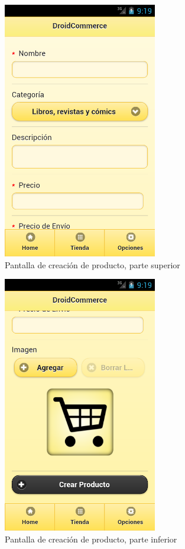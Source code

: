\begin{figure}
  \centering
    \includegraphics[width=0.6\textwidth]{imagenes/capturas/crear-producto1.png}
        \caption{Pantalla de creación de producto, parte superior}
    \label{fig:crear-producto-1}
\end{figure}

\begin{figure}
  \centering
    \includegraphics[width=0.6\textwidth]{imagenes/capturas/crear-producto2.png}
        \caption{Pantalla de creación de producto, parte inferior}
    \label{fig:crear-producto2}
\end{figure}

